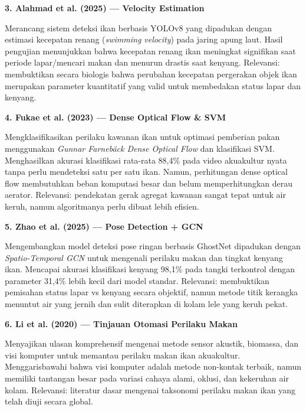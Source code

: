 \documentclass[11pt,a4paper]{article}
\begin{document}
\noindent\textbf{3. Alahmad et al. (2025) --- Velocity Estimation}\par
\noindent Merancang sistem deteksi ikan berbasis YOLOv8 yang dipadukan dengan estimasi kecepatan renang (\textit{swimming velocity}) pada jaring apung laut. Hasil pengujian menunjukkan bahwa kecepatan renang ikan meningkat signifikan saat periode lapar/mencari makan dan menurun drastis saat kenyang. Relevansi: membuktikan secara biologis bahwa perubahan kecepatan pergerakan objek ikan merupakan parameter kuantitatif yang valid untuk membedakan status lapar dan kenyang.
\vspace{0.7em}

\noindent\textbf{4. Fukae et al. (2023) --- Dense Optical Flow \& SVM}\par
\noindent Mengklasifikasikan perilaku kawanan ikan untuk optimasi pemberian pakan menggunakan \textit{Gunnar Farnebäck Dense Optical Flow} dan klasifikasi SVM. Menghasilkan akurasi klasifikasi rata-rata 88,4\% pada video akuakultur nyata tanpa perlu mendeteksi satu per satu ikan. Namun, perhitungan dense optical flow membutuhkan beban komputasi besar dan belum memperhitungkan derau aerator. Relevansi: pendekatan gerak agregat kawanan sangat tepat untuk air keruh, namun algoritmanya perlu dibuat lebih efisien.
\vspace{0.7em}

\noindent\textbf{5. Zhao et al. (2025) --- Pose Detection + GCN}\par
\noindent Mengembangkan model deteksi pose ringan berbasis GhostNet dipadukan dengan \textit{Spatio-Temporal GCN} untuk mengenali perilaku makan dan tingkat kenyang ikan. Mencapai akurasi klasifikasi kenyang 98,1\% pada tangki terkontrol dengan parameter 31,4\% lebih kecil dari model standar. Relevansi: membuktikan pemisahan status lapar vs kenyang secara objektif, namun metode titik kerangka menuntut air yang jernih dan sulit diterapkan di kolam lele yang keruh pekat.
\vspace{0.7em}

\noindent\textbf{6. Li et al. (2020) --- Tinjauan Otomasi Perilaku Makan}\par
\noindent Menyajikan ulasan komprehensif mengenai metode sensor akustik, biomassa, dan visi komputer untuk memantau perilaku makan ikan akuakultur. Menggarisbawahi bahwa visi komputer adalah metode non-kontak terbaik, namun memiliki tantangan besar pada variasi cahaya alami, oklusi, dan kekeruhan air kolam. Relevansi: literatur dasar mengenai taksonomi perilaku makan ikan yang telah diuji secara global.
\vspace{0.7em}
\end{document}

